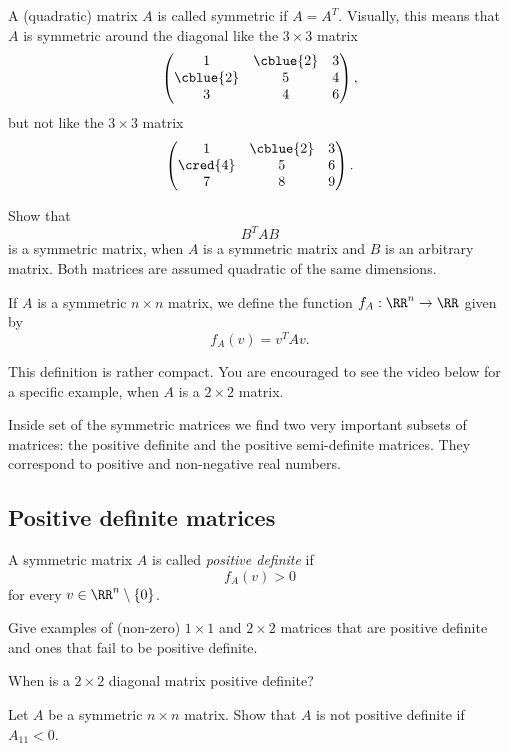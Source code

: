 \documentclass{article}
\begin{document}
A (quadratic) matrix $A$ is called symmetric if $A = A^T$. Visually,
this means that $A$ is symmetric around the diagonal like the
$3\times 3$ matrix
$$
\begin{pmatrix}
  1 & \cblue{2} & 3\\
  \cblue{2} & 5 & 4\\
  3 & 4 & 6
\end{pmatrix},
$$
but not like the $3\times 3$ matrix
$$
\begin{pmatrix}
  1 & \cblue{2} & 3\\
  \cred{4} & 5 & 6\\
  7 & 8 & 9
\end{pmatrix}.
$$

\beginshex
Show that
$$
B^T A B
$$
is a symmetric matrix, when $A$ is a symmetric matrix and
$B$ is an arbitrary matrix. Both matrices are assumed
quadratic of the same dimensions.
\endshex


If $A$ is a symmetric $n\times n$ matrix, we define the
function $f_A: \RR^n\rightarrow \RR$ given by
$$
f_A(v) = v^T A v.
$$

This definition is rather compact. You are encouraged to see the video below
for a specific example, when $A$ is a $2\times 2$ matrix.


\begin{video}\label{videoposdef}
\end{video}




Inside set of the symmetric matrices we find two very important subsets
of matrices: the positive definite and the positive semi-definite
matrices. They correspond to positive and non-negative
real numbers.

\subsection{Positive definite matrices}

A symmetric matrix $A$ is called \emph{positive definite} if
$$
f_A(v) > 0
$$
for every $v\in \RR^n\setminus\{0\}$.

\beginshex
Give examples of (non-zero) $1\times 1$ and $2\times 2$ matrices that are
positive definite and ones that fail to be positive
definite.

When is a $2\times 2$ diagonal matrix positive definite?
\endshex

\beginshex
Let $A$ be a symmetric $n\times n$ matrix. Show that
$A$ is not positive definite if $A_{11} < 0$.
\endshex
\end{document}
